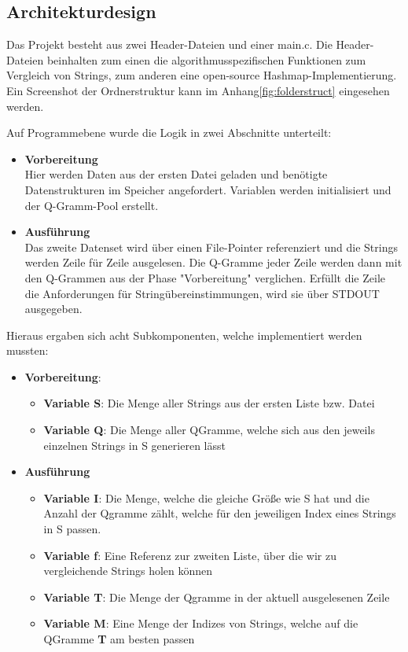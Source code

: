 \subsection{Architekturdesign}
Das Projekt besteht aus zwei Header-Dateien und einer main.c. Die Header-Dateien
beinhalten zum einen die algorithmusspezifischen Funktionen zum Vergleich von
Strings, zum anderen eine open-source Hashmap-Implementierung. Ein Screenshot der
Ordnerstruktur kann im Anhang\ref{fig:folderstruct} eingesehen werden.

Auf Programmebene wurde die Logik in zwei Abschnitte unterteilt:
\begin{itemize}
    \item \textbf{Vorbereitung} \\
    Hier werden Daten aus der ersten Datei geladen und benötigte Datenstrukturen im Speicher angefordert.
    Variablen werden initialisiert und der Q-Gramm-Pool erstellt.
    \item \textbf{Ausführung} \\
    Das zweite Datenset wird über einen File-Pointer referenziert und die
    Strings werden Zeile für Zeile ausgelesen. Die Q-Gramme jeder Zeile werden dann mit den Q-Grammen aus der Phase "Vorbereitung" verglichen. Erfüllt die Zeile die Anforderungen für Stringübereinstimmungen, wird sie über STDOUT ausgegeben.
\end{itemize}

Hieraus ergaben sich acht Subkomponenten, welche implementiert werden mussten:


\begin{itemize}
    \item \textbf{Vorbereitung}:
    \begin{itemize}
        \item \textbf{Variable S}: Die Menge aller Strings aus der ersten Liste bzw. Datei
        \item \textbf{Variable Q}: Die Menge aller QGramme, welche sich aus den jeweils einzelnen Strings in S generieren lässt
    \end{itemize}

    \item \textbf{Ausführung}
    \begin{itemize}
        \item \textbf{Variable I}: Die Menge, welche die gleiche Größe wie S hat und die
        Anzahl der Qgramme zählt, welche für den jeweiligen Index eines Strings in
        S passen.
        \item \textbf{Variable f}: Eine Referenz zur zweiten Liste, über die wir zu vergleichende Strings holen können
        \item \textbf{Variable T}: Die Menge der Qgramme in der aktuell ausgelesenen Zeile
        \item \textbf{Variable M}: Eine Menge der Indizes von Strings, welche auf die QGramme \textbf{T} am besten passen
    \end{itemize}
\end{itemize}

